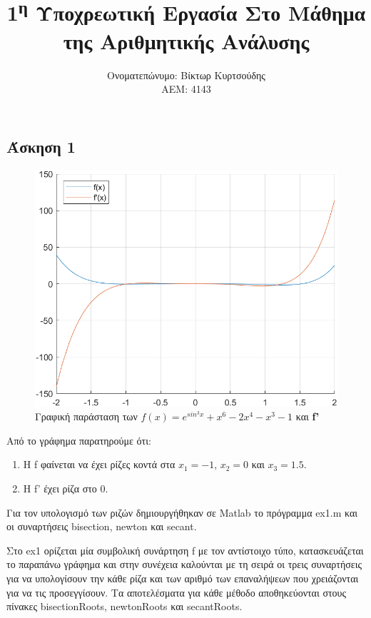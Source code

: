 \documentclass[a4paper,11pt]{article}
\title{1\textsuperscript{η} Υποχρεωτική Εργασία Στο Μάθημα της Αριθμητικής Ανάλυσης}
\author{Ονοματεπώνυμο: Βίκτωρ Κυρτσούδης \\ ΑΕΜ: 4143}
\date{}
\begin{document}
\maketitle

\begin{flushleft}
\boldmath

\section*{Άσκηση 1}
\begin{figure}[h]
    \caption*{Γραφική παράσταση των $f(x) = e^{sin^3x}+x^6-2x^4-x^3-1$ και \textbf{f'}}
    \includegraphics[width=\textwidth]{ex1plot.png}
\end{figure}

Από το γράφημα παρατηρούμε ότι:
\begin{enumerate}
    \item Η f φαίνεται να έχει ρίζες κοντά στα $x_1=-1$, $x_2=0$ και $x_3=1.5$.
    \item Η f' έχει ρίζα στο 0.
\end{enumerate}

Για τον υπολογισμό των ριζών δημιουργήθηκαν σε Matlab το πρόγραμμα ex1.m και οι συναρτήσεις bisection, newton και secant.

Στο ex1 ορίζεται μία συμβολική συνάρτηση f με τον αντίστοιχο τύπο, κατασκευάζεται το παραπάνω γράφημα και στην συνέχεια καλούνται με τη σειρά οι τρεις συναρτήσεις για να υπολογίσουν την κάθε ρίζα και των αριθμό των επαναλήψεων που χρειάζονται για να τις προσεγγίσουν. Τα αποτελέσματα για κάθε μέθοδο αποθηκεύονται στους πίνακες bisectionRoots, newtonRoots και secantRoots.
\linebreak


\end{flushleft}
\end{document}
